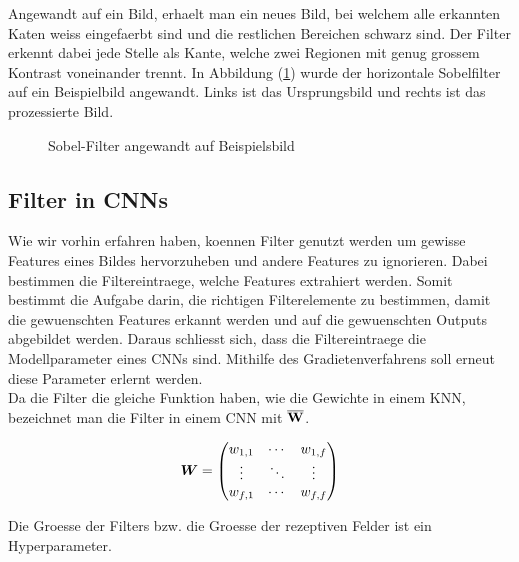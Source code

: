 Angewandt auf ein Bild, erhaelt man ein neues Bild, bei welchem alle erkannten
Katen weiss eingefaerbt sind und die restlichen Bereichen schwarz sind.
Der Filter erkennt dabei jede Stelle als Kante, welche zwei Regionen mit
genug grossem Kontrast voneinander trennt.
In Abbildung (\ref{fig:sobel_filter}) wurde der horizontale Sobelfilter auf ein
Beispielbild angewandt. Links ist das Ursprungsbild und rechts ist das
prozessierte Bild.


\begin{figure}[h!]

  \caption{Sobel-Filter angewandt auf Beispielsbild}
  \label{fig:sobel_filter}
\end{figure}

\para{}
\cite{wiki:sobel_operator}
\cite{deeplearning.ai:cnn}
\cite{wiki:kernel}


\subsection{Filter in CNNs}
Wie wir vorhin erfahren haben, koennen Filter genutzt werden um gewisse
Features eines Bildes hervorzuheben und andere Features zu ignorieren. Dabei
bestimmen die Filtereintraege, welche Features extrahiert werden. Somit bestimmt
die Aufgabe darin, die richtigen Filterelemente zu bestimmen, damit die
gewuenschten Features erkannt werden und auf die gewuenschten Outputs abgebildet
werden. Daraus schliesst sich, dass die Filtereintraege die Modellparameter
eines CNNs sind. Mithilfe des Gradietenverfahrens soll erneut diese Parameter
erlernt werden. \\
Da die Filter die gleiche Funktion haben, wie die Gewichte in einem KNN,
bezeichnet man die Filter in einem CNN mit $\overline{\mathbf{W}}$.

\begin{equation*}
  \bm{W} = \begin{pmatrix}
    w_{1,1} & \cdots & w_{1,f} \\
    \vdots & \ddots & \vdots \\
    w_{f,1} & \cdots & w_{f,f}
  \end{pmatrix}
\end{equation*}

Die Groesse der Filters bzw. die Groesse der rezeptiven Felder ist
ein Hyperparameter.
\para{}


